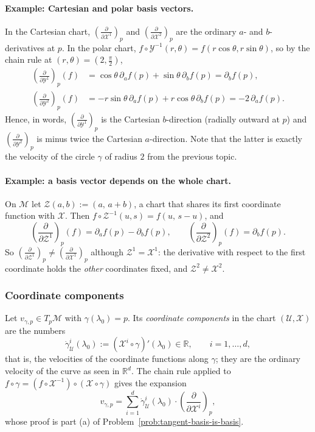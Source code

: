 \documentclass[11pt]{article}
\newcommand{\TpM}{T_p\mathcal M}
\begin{document}
\paragraph{Example: Cartesian and polar basis vectors.} In the Cartesian chart, $\left(\frac{\partial}{\partial\mathcal X^1}\right)_p$ and $\left(\frac{\partial}{\partial\mathcal X^2}\right)_p$ are the ordinary $a$- and $b$-derivatives at $p$. In the polar chart, $f\circ\mathcal Y^{-1}(r,\theta)=f(r\cos\theta,r\sin\theta)$, so by the chain rule at $(r,\theta)=(2,\tfrac\pi2)$,
\begin{align*}
\left(\frac{\partial}{\partial\mathcal Y^1}\right)_p(f)&=\cos\theta\,\partial_af(p)+\sin\theta\,\partial_bf(p)=\partial_bf(p),\\
\left(\frac{\partial}{\partial\mathcal Y^2}\right)_p(f)&=-r\sin\theta\,\partial_af(p)+r\cos\theta\,\partial_bf(p)=-2\,\partial_af(p).
\end{align*}
Hence, in words, $\left(\frac{\partial}{\partial\mathcal Y^1}\right)_p$ is the Cartesian $b$-direction (radially outward at $p$) and $\left(\frac{\partial}{\partial\mathcal Y^2}\right)_p$ is minus twice the Cartesian $a$-direction. Note that the latter is exactly the velocity of the circle $\gamma$ of radius $2$ from the previous topic.

\paragraph{Example: a basis vector depends on the whole chart.} On $\mathcal M$ let $\mathcal Z(a,b):=(a,\,a+b)$, a chart that shares its first coordinate function with $\mathcal X$. Then $f\circ\mathcal Z^{-1}(u,s)=f(u,\,s-u)$, and
\[
\left(\frac{\partial}{\partial\mathcal Z^1}\right)_p(f)=\partial_af(p)-\partial_bf(p),\qquad\left(\frac{\partial}{\partial\mathcal Z^2}\right)_p(f)=\partial_bf(p).
\]
So $\left(\frac{\partial}{\partial\mathcal Z^1}\right)_p\neq\left(\frac{\partial}{\partial\mathcal X^1}\right)_p$ although $\mathcal Z^1=\mathcal X^1$: the derivative with respect to the first coordinate holds the \emph{other} coordinates fixed, and $\mathcal Z^2\neq\mathcal X^2$.

\subsubsection*{Coordinate components}
Let $v_{\gamma,p}\in\TpM$ with $\gamma(\lambda_0)=p$. Its \emph{coordinate components} in the chart $(\mathcal U,\mathcal X)$ are the numbers
\[
\dot\gamma^i_{\mathcal U}(\lambda_0):=(\mathcal X^i\circ\gamma)'(\lambda_0)\in\mathbb R,\qquad i=1,\dots,d,
\]
that is, the velocities of the coordinate functions along $\gamma$; they are the ordinary velocity of the curve as seen in $\mathbb R^d$. The chain rule applied to $f\circ\gamma=(f\circ\mathcal X^{-1})\circ(\mathcal X\circ\gamma)$ gives the expansion
\[
v_{\gamma,p}=\sum_{i=1}^d\dot\gamma^i_{\mathcal U}(\lambda_0)\cdot\left(\frac{\partial}{\partial\mathcal X^i}\right)_p,
\]
whose proof is part (a) of Problem~\ref{prob:tangent-basis-is-basis}.
\end{document}
